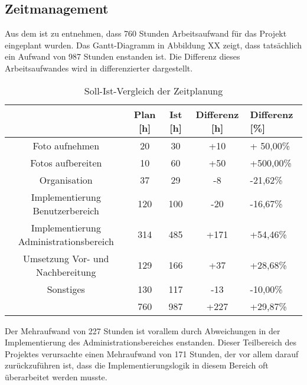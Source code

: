 \subsection{Zeitmanagement}
\label{sec:Zeitmanagement}

Aus dem  ist zu entnehmen, dass 760 Stunden Arbeitsaufwand für das Projekt
eingeplant wurden. Das Gantt-Diagramm in Abbildung XX zeigt, dass tatsächlich
ein Aufwand von 987 Stunden enstanden ist.
Die Differenz dieses Arbeitsaufwandes wird in  differenzierter dargestellt.

\begin{table}[h]
\centering
\begin{tabular}{ccccl}
\hline
\multicolumn{1}{l}{}                 & Plan {[}h{]} & Ist {[}h{]} & Differenz {[}h{]} & Differenz {[}\%{]} \\ \hline
Foto aufnehmen                       & 20           & 30          & +10               & + 50,00\%          \\ \hline
Fotos aufbereiten                    & 10           & 60          & +50               & +500,00\%          \\ \hline
Organisation                         & 37           & 29          & -8                & -21,62\%           \\ \hline
Implementierung Benutzerbereich       & 120          & 100         & -20              
& -16,67\%           \\ \hline Implementierung Administrationsbereich & 314         
& 485 & +171              & +54,46\%           \\ \hline Umsetzung Vor- und Nachbereitung     & 129          & 166         & +37               & +28,68\%           \\ \hline
Sonstiges                            & 130          & 117         & -13               & -10,00\%           \\ \hline
                                     & 760          & 987         & +227              & +29,87\%           \\ \hline
\end{tabular}
\caption{Soll-Ist-Vergleich der Zeitplanung}%
\label{tab:SollIstVergleichZeit}%
\end{table}


Der Mehraufwand von 227 Stunden ist vorallem durch Abweichungen in der Implementierung des Administrationsbereiches
enstanden. Dieser Teilbereich des Projektes verursachte einen Mehraufwand von
171 Stunden, der vor allem darauf zurückzuführen ist, dass die Implementierungslogik in diesem Bereich oft überarbeitet werden musste.

